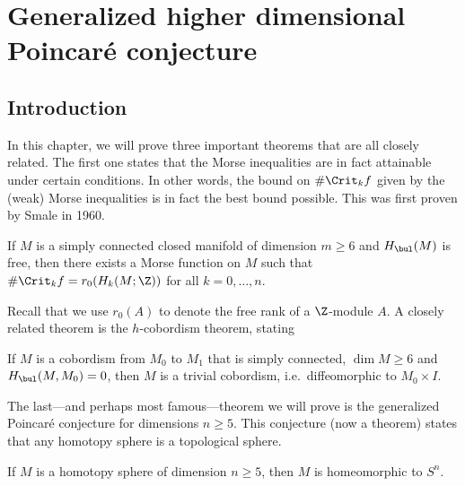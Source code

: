\chapter[Generalized Poincaré conjecture]{Generalized higher dimensional Poincaré conjecture}
\label{chap:h-cobord}
\section{Introduction}

In this chapter, we will prove three important theorems that are all closely related.
The first one states that the Morse inequalities are in fact attainable under certain conditions.
In other words, the bound on $\# \Crit_k f$ given by the (weak) Morse inequalities is in fact the best bound possible. This was first proven by Smale in 1960.
\begin{theorem}
    If $M$ is a simply connected closed manifold of dimension  $m \ge  6$ and $H_\bul(M)$ is free, then there exists a Morse function on  $M$ such that  $\# \Crit_k f = r_0(H_k(M; \Z))$ for all $k = 0, \ldots, n$.
\end{theorem}
Recall that we use $r_0(A)$ to denote the free rank of a $\Z$-module $A$.
A closely related theorem is the $h$-cobordism theorem, stating
\begin{theorem}
    If $M$ is a cobordism from $M_0$ to $M_1$ that is simply connected, $\dim M \ge 6$ and $H_{\bul}(M,M_0) = 0$, then $M$ is a trivial cobordism, i.e.\ diffeomorphic to  $ M_0 \times I$.
\end{theorem}
The last---and perhaps most famous---theorem we will prove is the generalized Poincaré conjecture for dimensions $n \ge 5$.
This conjecture (now a theorem) states that any homotopy sphere is a topological sphere.
\begin{theorem}
    If $M$ is a homotopy sphere of dimension  $n \ge 5$, then $M$ is homeomorphic to  $S^{n}$.
\end{theorem}


